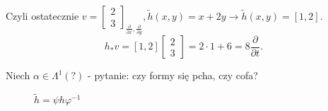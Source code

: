\documentclass[../main.tex]{subfiles}
\begin{document}
\begin{przyklad}
Czyli ostatecznie $v = \begin{bmatrix} 2\\3 \end{bmatrix}_{\frac{\partial }{\partial x}, \frac{\partial }{\partial y} }, \tilde h(x,y) = x+2y \to \tilde h(x,y) = \left[ 1,2 \right] $.\\
\[
    h_* v = \left[ 1,2 \right] \begin{bmatrix} 2\\3 \end{bmatrix} = 2\cdot 1+ 6 = 8 \frac{\partial }{\partial t}
.\]
\end{przyklad}

Niech $\alpha\in \Lambda^1(?)$ - pytanie: czy formy się pcha, czy cofa?


\begin{figure}[h]
    \centering
    \caption{$\tilde h = \psi h \varphi^{-1}$ }
    \label{fig:fig_56}
\end{figure}
\end{document}
